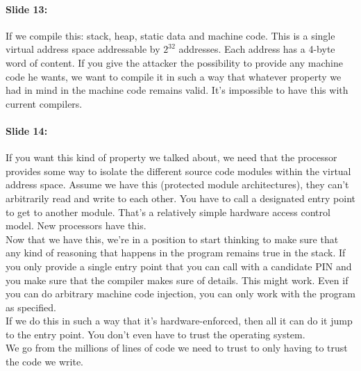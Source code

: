 \documentclass[10pt,a4paper]{report}
\begin{document}
\paragraph{Slide 13:} If we compile this: stack, heap, static data and machine code. This is a single virtual address space addressable by $2^{32}$ addresses. Each address has a 4-byte word of content. If you give the attacker the possibility to provide any machine code he wants, we want to compile it in such a way that whatever property we had in mind in the machine code remains valid. It's impossible to have this with current compilers.

\paragraph{Slide 14:} If you want this kind of property we talked about, we need that the processor provides some way to isolate the different source code modules within the virtual address space. Assume we have this (protected module architectures), they can't arbitrarily read and write to each other. You have to call a designated entry point to get to another module. That's a relatively simple hardware access control model. New processors have this.\\
Now that we have this, we're in a position to start thinking to make sure that any kind of reasoning that happens in the program remains true in the stack. If you only provide a single entry point that you can call with a candidate PIN and you make sure that the compiler makes sure of details. This might work. Even if you can do arbitrary machine code injection, you can only work with the program as specified.\\
If we do this in such a way that it's hardware-enforced, then all it can do it jump to the entry point. You don't even have to trust the operating system.\\
We go from the millions of lines of code we need to trust to only having to trust the code we write.
\end{document}
